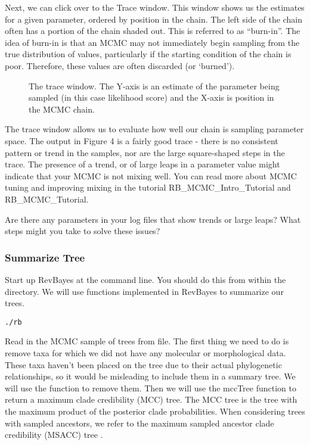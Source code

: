 Next, we can click over to the Trace window.
This window shows us the estimates for a given parameter, ordered by position in the chain.
The left side of the chain often has a portion of the chain shaded out. This is referred to as ``burn-in''.
The idea of burn-in is that an MCMC may not immediately begin sampling from the true distribution of values, particularly if the starting condition of the chain is poor.
Therefore, these values are often discarded (or `burned'). \par
\begin{figure}[h!]
\centering
{}
\caption{\small The trace window. The Y-axis is an estimate of the parameter being sampled (in this case likelihood score) and the X-axis is position in the MCMC chain.}
\label{fig:tracer}
\end{figure}
The trace window allows us to evaluate how well our chain is sampling parameter space.
The output in Figure 4 is a fairly good trace - there is no consistent pattern or trend in the samples, nor are the large square-shaped steps in the trace.
The presence of a trend, or of large leaps in a parameter value might indicate that your MCMC is not mixing well.
You can read more about MCMC tuning and improving mixing in the tutorial RB\_MCMC\_Intro\_Tutorial and RB\_MCMC\_Tutorial.

Are there any parameters in your log files that show trends or large leaps? What steps might you take to solve these issues?

\medskip
\subsubsection{Summarize Tree}\label{subsub:RB-SummarizeTree}


Start up RevBayes at the command line.
You should do this from within the  directory.
We will use functions implemented in RevBayes to summarize our trees.
{\tt \begin{snugshade*}
\begin{lstlisting}
./rb
\end{lstlisting}
\end{snugshade*}}

Read in the MCMC sample of trees from file.
The first thing we need to do is remove taxa for which we did not have any molecular or morphological data.
These taxa haven't been placed on the tree due to their actual phylogenetic relationships, so it would be misleading to include them in a  summary tree.
We will use the  function to remove them.
Then we will use the mccTree function to return a maximum clade credibility (MCC) tree.
The MCC tree is the tree with the maximum product of the posterior clade probabilities.
When considering trees with sampled ancestors, we refer to the maximum sampled ancestor clade credibility (MSACC) tree \citep{Gavryushkina2016}.

